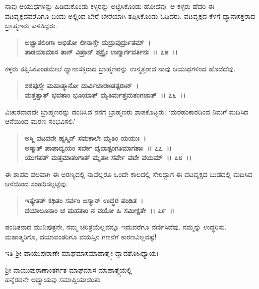 ನಾವು ಆಯುಧಗಳನ್ನು ಹಿಡಿದುಕೊಂಡು ಕಳ್ಳರನ್ನು ಅಟ್ಟಿಸಿಕೊಂಡು ಹೋದೆವು. ಆ ಕಳ್ಳರು ಹೆದರಿ ಈ ವಟವೃಕ್ಷದವರೆವಿಗೂ ಬಂದು ಅಲ್ಲಿಂದ ಬೇರೆ ಬೇರೆಯಾಗಿ ತಪ್ಪಿಸಿಕೊಂಡು ಓಡಿದರು. ವಟವೃಕ್ಷದ ಕೆಳಗೆ ಧ್ಯಾನಾಸಕ್ತರಾದ ಬ್ರಾಹ್ಮಣರು ಕುಳಿತಿದ್ದರು.

\begin{verse}
\textbf{ಅಜ್ಞಾತಲಿಂಗಾ ಅಭಿತೋ ಲೀನಾಸ್ತೇ ದುದ್ರುವುರ್ದ್ರುತಮ್~।}\\\textbf{ತಾಡಯಾಮಾಸ ತಾನ್ ವಿಪ್ರಾನ್ ಶಸ್ತ್ರೈಃ ಉನ್ಮಾರ್ಗವರ್ತಿನಃ~।। ೭೫~।।}
\end{verse}

ಕಳ್ಳರು ತಪ್ಪಿಸಿಕೊಂಡಮೇಲೆ ಧ್ಯಾನಾಸಕ್ತರಾದ ಬ್ರಾಹ್ಮಣರನ್ನು ಉನ್ಮತ್ತರಾದ ನಾವು ಆಯುಧಗಳಿಂದ ಹೊಡೆದೆವು.

\begin{verse}
\textbf{ಶಶಪುಸ್ತೇ ಮಹಾತ್ಮಾನೋ ದುರ್ವಿಚಾರಣತತ್ಪರಾನ್~।}\\\textbf{ಮತ್ತತ್ವಾತ್ ಭವತಾಂ ಭೂಯಾತ್ ಮೃತಿರ್ಮತ್ತಮತಂಗಜಾತ್~।। ೭೬~।।}
\end{verse}

ವಿಚಾರವಾಡದೇ ಬ್ರಾಹ್ಮಣರನ್ನು ದಂಡಿಸಿದ ನನಗೆ ಬ್ರಾಹ್ಮಣರು ಶಾಪಕೊಟ್ಟರು: `ದುರ\-ಹಂಕಾರದಿಂದ ನಿಮಗೆ ಮದಿಸಿದ ಆನೆಯಿಂದ ಮರಣ ಸಂಭವಿಸಲಿ.'

\begin{verse}
\textbf{ಅಸ್ಮಿ ವಟವನೇ ಹ್ಯಸ್ಮಿನ್ ಸಮಕಾಲೇ ಮೃತಿಂ ಯಯುಃ~।}\\\textbf{ಅಸ್ಮಾತ್ ಪಾಪಾದ್ವಯಂ ಸರ್ವೇ ದೈವಾತ್ಸಂಗತಿಮಾಗತಾಃ~।। ೭೭~।। }\\\textbf{ಯುಗಪತ್ ಮತ್ತಮಾತಂಗಾತ್ ಮೃತಾಃ ಸರ್ವೇ ವಟೇ ವಯಮ್~।। ೭೮~।।}
\end{verse}

ಈ ಶಾಪದ ಫಲವಾಗಿ ಈ ಅರಣ್ಯದಲ್ಲಿ ನಾವೆಲ್ಲರೂ ಒಂದೇ ಕಾಲದಲ್ಲಿ ಸೇರಿದ್ದಾಗ ಈ ವಟವೃಕ್ಷದ ಬುಡದಲ್ಲಿ ಮದಿಸಿದ ಆನೆಯಿಂದ ಸಂಹರಿಸಲ್ಪಟ್ಟೆವು.

\begin{verse}
\textbf{ಇತ್ಯೇತತ್ ಕಥಿತಂ ಸರ್ವಂ ಅಸ್ಮಾನ್ ಉದ್ಧರ ಪಂಡಿತ~।}\\\textbf{ದಯಾಲೂನಾಂ ಚ ಮಹತಾಂ ನ ವಯೋ ಹಿ ಸಮೀಕ್ಷತೇ~।। ೭೯~।।}
\end{verse}

ಪಂಡಿತನಾದ ಮುನಿಪುತ್ರನೇ, ನಮ್ಮ ಚರಿತ್ರೆಯೆಲ್ಲವನ್ನೂ ಇದುವರೆಗೂ ವರ್ಣಿಸಿದೆವು. ನಮ್ಮನ್ನು ಉದ್ಧರಿಸು. ಮಹಾತ್ಮರಿಗೂ, ದಯಾವಂತರಿಗೂ ವಯಸ್ಸಿನ ಗಣನೆಗೆ ಕಾರಣವಿಲ್ಲವಷ್ಟೆ!

\begin{center}
ಇತಿ ಶ‍್ರೀ ವಾಯುಪುರಾಣೇ ಮಾಘಮಾಸಮಾಹಾತ್ಮ್ಯೇ ದ್ವಾದಶೋsಧ್ಯಾಯಃ
\end{center}

\begin{center}
 ಶ‍್ರೀ ವಾಯುಪುರಾಣಾಂತರ್ಗತ ಮಾಘಮಾಸ ಮಾಹಾತ್ಮ್ಯೆಯಲ್ಲಿ \\ ಹನ್ನೆರಡನೇ ಅಧ್ಯಾಯವು ಸಮಾಪ್ತಿಯಾಯಿತು.
\end{center}

